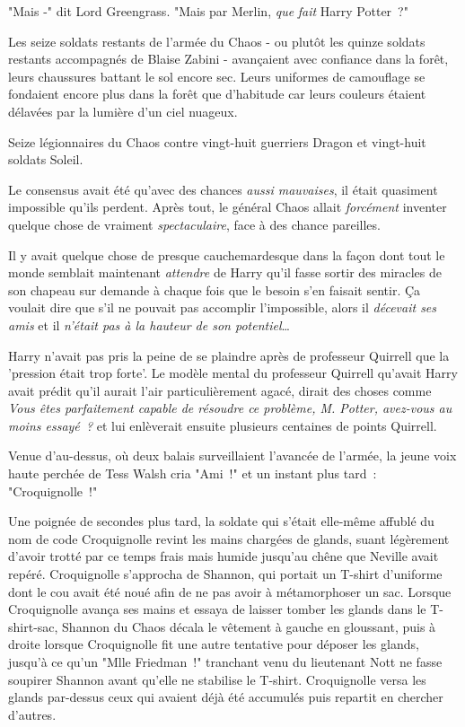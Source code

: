 "Mais -" dit Lord Greengrass. "Mais par Merlin, \emph{que} \emph{fait} Harry Potter~?"

\later

Les seize soldats restants de l'armée du Chaos - ou plutôt les quinze soldats restants accompagnés de Blaise Zabini - avançaient avec confiance dans la forêt, leurs chaussures battant le sol encore sec. Leurs uniformes de camouflage se fondaient encore plus dans la forêt que d'habitude car leurs couleurs étaient délavées par la lumière d'un ciel nuageux.

Seize légionnaires du Chaos contre vingt-huit guerriers Dragon et vingt-huit soldats Soleil.

Le consensus avait été qu'avec des chances \emph{aussi mauvaises}, il était quasiment impossible qu'ils perdent. Après tout, le général Chaos allait \emph{forcément} inventer quelque chose de vraiment \emph{spectaculaire}, face à des chance pareilles.

Il y avait quelque chose de presque cauchemardesque dans la façon dont tout le monde semblait maintenant \emph{attendre} de Harry qu'il fasse sortir des miracles de son chapeau sur demande à chaque fois que le besoin s'en faisait sentir. Ça voulait dire que s'il ne pouvait pas accomplir l'impossible, alors il \emph{décevait ses amis} et il \emph{n'était pas à la hauteur de son potentiel}…

Harry n'avait pas pris la peine de se plaindre après de professeur Quirrell que la 'pression était trop forte'. Le modèle mental du professeur Quirrell qu'avait Harry avait prédit qu'il aurait l'air particulièrement agacé, dirait des choses comme \emph{Vous êtes parfaitement capable de résoudre ce problème, M. Potter, avez-vous au moins essayé~?} et lui enlèverait ensuite plusieurs centaines de points Quirrell.

Venue d'au-dessus, où deux balais surveillaient l'avancée de l'armée, la jeune voix haute perchée de Tess Walsh cria "Ami~!" et un instant plus tard~: "Croquignolle~!"

Une poignée de secondes plus tard, la soldate qui s'était elle-même affublé du nom de code Croquignolle revint les mains chargées de glands, suant légèrement d'avoir trotté par ce temps frais mais humide jusqu'au chêne que Neville avait repéré. Croquignolle s'approcha de Shannon, qui portait un T-shirt d'uniforme dont le cou avait été noué afin de ne pas avoir à métamorphoser un sac. Lorsque Croquignolle avança ses mains et essaya de laisser tomber les glands dans le T-shirt-sac, Shannon du Chaos décala le vêtement à gauche en gloussant, puis à droite lorsque Croquignolle fit une autre tentative pour déposer les glands, jusqu'à ce qu'un "Mlle Friedman~!" tranchant venu du lieutenant Nott ne fasse soupirer Shannon avant qu'elle ne stabilise le T-shirt. Croquignolle versa les glands par-dessus ceux qui avaient déjà été accumulés puis repartit en chercher d'autres.

